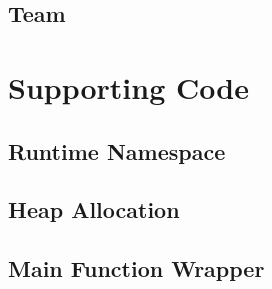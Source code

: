 \subsection{Team}

\section{Supporting Code}
\label{sec:supporting-code}

\subsection{Runtime Namespace}

\subsection{Heap Allocation}

\subsection{Main Function Wrapper}
